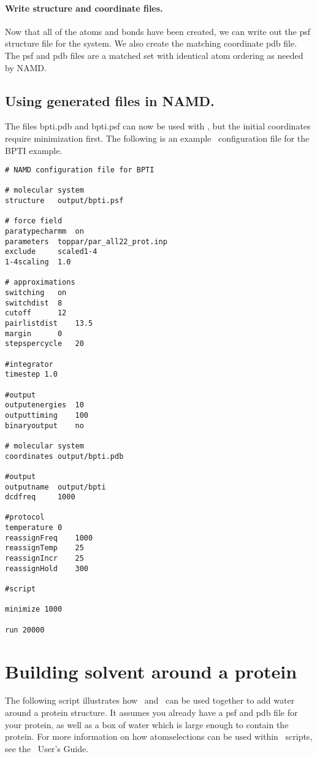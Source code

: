 \paragraph*{Write structure and coordinate files.}
Now that all of the atoms and bonds have been created, we can write
out the psf structure file for the system.
We also create the matching coordinate pdb file.  The psf and pdb files
are a matched set with identical atom ordering as needed by NAMD.


\subsection*{Using generated files in NAMD.}

The files bpti.pdb and bpti.psf can now be used with \NAMD, but the
initial coordinates require minimization first.
The following is an example \NAMD\ configuration file for the BPTI example.

\begin{verbatim}
# NAMD configuration file for BPTI

# molecular system
structure	output/bpti.psf

# force field
paratypecharmm	on
parameters	toppar/par_all22_prot.inp
exclude		scaled1-4
1-4scaling	1.0

# approximations
switching	on
switchdist	8
cutoff		12
pairlistdist	13.5
margin		0
stepspercycle	20

#integrator
timestep 1.0

#output
outputenergies	10
outputtiming	100
binaryoutput	no

# molecular system
coordinates	output/bpti.pdb

#output
outputname	output/bpti
dcdfreq		1000

#protocol
temperature	0
reassignFreq	1000
reassignTemp	25
reassignIncr	25
reassignHold	300

#script

minimize 1000

run 20000
\end{verbatim}

\section{Building solvent around a protein}
The following script illustrates how \PSFGEN\ and \VMD\ can be used together
to add water around a protein structure.  It assumes you already have a 
psf and pdb file for your protein, as well as a box of water which is 
large enough to contain the protein. For more information on how atomselections
can be used within \VMD\ scripts, see the \VMD\ User's Guide.

